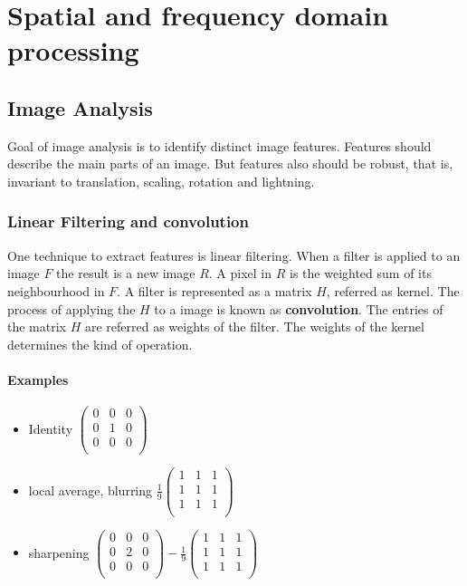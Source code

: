 \documentclass[10pt,a4paper]{article}
\begin{document}
\section{Spatial and frequency domain processing}
\subsection{Image Analysis}
Goal of image analysis is to identify distinct image features. Features should describe the main parts of an image. 
But features also should be robust, that is, invariant to translation, scaling, 
rotation and lightning.

\subsubsection{Linear Filtering and convolution}
One technique to extract features is linear filtering. When a filter is applied to an image $F$ the result is a new image $R$. A pixel in $R$ is the weighted sum of its neighbourhood in $F$. A filter is represented as a matrix $H$, referred as kernel. The process of applying the $H$ to a image is known as \textbf{convolution}. The entries of the matrix $H$ are referred as weights of the filter.
The weights of the kernel determines the kind of operation.

\paragraph{Examples}
\begin{itemize}
\item Identity 
$\begin{pmatrix}
0 & 0 & 0\\
0 & 1 & 0\\
0 & 0 & 0\\
\end{pmatrix}$
\item local average, blurring
$\frac{1}{9} \begin{pmatrix}
1 & 1 & 1\\
1 & 1 & 1\\
1 & 1 & 1\\
\end{pmatrix}$
\item sharpening
$\begin{pmatrix}
0 & 0 & 0\\
0 & 2 & 0\\
0 & 0 & 0\\
\end{pmatrix} -
\frac{1}{9} \begin{pmatrix}
1 & 1 & 1\\
1 & 1 & 1\\
1 & 1 & 1\\
\end{pmatrix}$
\end{itemize}
\end{document}
